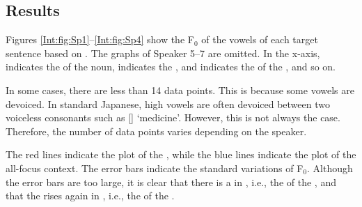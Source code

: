 \subsection{Results}

Figures \ref{Int:fig:Sp1}--\ref{Int:fig:Sp4} show
the F$_{0}$ of the vowels of each target sentence based on .
The graphs of Speaker 5--7 are omitted.
In the x-axis,  indicates the  of the noun,  indicates the , and
 indicates the  of the , and so on.

In some cases, there are less than 14 data points.
This is because some vowels are devoiced.
In standard Japanese, high vowels are often devoiced between two voiceless consonants such as  [] `medicine'.
However, this is not always the case.
Therefore, the number of data points varies depending on the speaker.

The red lines indicate the plot of the ,
while the blue lines indicate the plot of the all-focus context.
The error bars indicate the standard variations of F$_{0}$.
Although the error bars are too large,
it is clear that there is a  in , i.e., the  of the ,
and that the  rises again in , i.e., the  of the .

